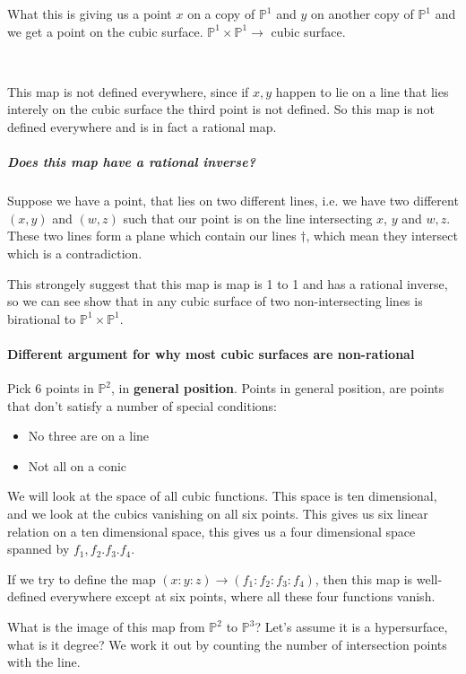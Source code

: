 What this is giving us a point $x$ on a copy of $\mathbb{P}^1$ and $y$ on another copy of $\mathbb{P}^1$ and we get a point on the cubic surface. $\mathbb{P}^1\times \mathbb{P}^1\rightarrow $ cubic surface.

\

This map is not defined everywhere, since if $x,y$ happen to lie on a line that lies interely on the cubic surface the third point is not defined. So this map is not defined everywhere and is in fact a rational map.

\subparagraph*{Does this map have a rational inverse?}
Suppose we have a point, that lies on two different lines, i.e. we have two different $(x,y)$ and $(w,z)$ such that our point is on the line intersecting $x$, $y$ and $w,z$. These two lines form a plane which contain our lines $\dagger$, which mean they intersect which is a contradiction.

This strongely suggest that this map is map is 1 to 1 and has a rational inverse, so we can see show that in any cubic surface of two non-intersecting lines is birational to $\mathbb{P}^1\times \mathbb{P}^1$.


\paragraph*{Different argument for why most cubic surfaces are non-rational}

Pick $6$ points in $\mathbb{P}^2$, in \textbf{general position}. Points in general position, are points that don't satisfy a number of special conditions:\begin{itemize}
    \item No three are on a line
    \item Not all on a conic
\end{itemize} 

We will look at the space of all cubic functions. This space is ten dimensional, and we look at the cubics vanishing on all six points. This gives us six linear relation on a ten dimensional space, this gives us a four dimensional space spanned by $f_1,f_2.f_3.f_4$.  

If we try to define the map $(x\colon y\colon z)\rightarrow (f_1\colon f_2\colon f_3\colon f_4)$, then this map is well-defined everywhere except at six points, where all these four functions vanish.

What is the image of this map from $\mathbb{P}^2$ to $\mathbb{P}^3$? Let's assume it is a hypersurface, what is it degree? We work it out by counting the number of intersection points with the line.

